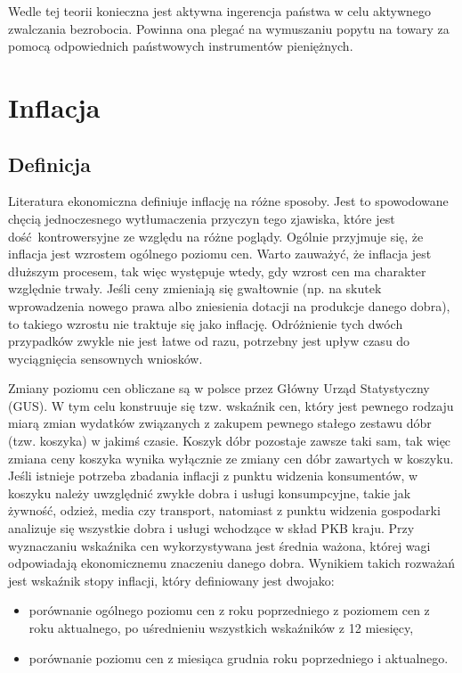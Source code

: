 \documentclass[12pt]{extarticle}
\begin{document}
Wedle tej teorii konieczna jest aktywna ingerencja państwa w celu aktywnego zwalczania bezrobocia. Powinna ona plegać na wymuszaniu popytu na towary za pomocą odpowiednich państwowych instrumentów pieniężnych.

\section{Inflacja}

\subsection{Definicja}

Literatura ekonomiczna definiuje inflację na różne sposoby. Jest to spowodowane chęcią jednoczesnego wytłumaczenia przyczyn tego zjawiska, które jest dość kontrowersyjne ze względu na różne poglądy. Ogólnie przyjmuje się, że inflacja jest wzrostem ogólnego poziomu cen. Warto zauważyć, że inflacja jest dłuższym procesem, tak więc występuje wtedy, gdy wzrost cen ma charakter względnie trwały. Jeśli ceny zmieniają się gwałtownie (np. na skutek wprowadzenia nowego prawa albo zniesienia dotacji na produkcje danego dobra), to takiego wzrostu nie traktuje się jako inflację. Odróżnienie tych dwóch przypadków zwykle nie jest łatwe od razu, potrzebny jest upływ czasu do wyciągnięcia sensownych wniosków.

Zmiany poziomu cen obliczane są w polsce przez Główny Urząd Statystyczny (GUS). W tym celu konstruuje się tzw. wskaźnik cen, który jest pewnego rodzaju miarą zmian wydatków związanych z zakupem pewnego stałego zestawu dóbr (tzw. koszyka) w jakimś czasie. Koszyk dóbr pozostaje zawsze taki sam, tak więc zmiana ceny koszyka wynika wyłącznie ze zmiany cen dóbr zawartych w koszyku. Jeśli istnieje potrzeba zbadania inflacji z punktu widzenia konsumentów, w koszyku należy uwzględnić zwykłe dobra i usługi konsumpcyjne, takie jak żywność, odzież, media czy transport, natomiast z punktu widzenia gospodarki analizuje się wszystkie dobra i usługi wchodzące w skład PKB kraju. Przy wyznaczaniu wskaźnika cen wykorzystywana jest średnia ważona, której wagi odpowiadają ekonomicznemu znaczeniu danego dobra. Wynikiem takich rozważań jest wskaźnik stopy inflacji, który definiowany jest dwojako: 


\begin{itemize}
	\item porównanie ogólnego poziomu cen z roku poprzedniego z poziomem cen z roku aktualnego, po uśrednieniu wszystkich wskaźników z 12 miesięcy,
    \item porównanie poziomu cen z miesiąca grudnia roku poprzedniego i aktualnego.
\end{itemize}
\end{document}

